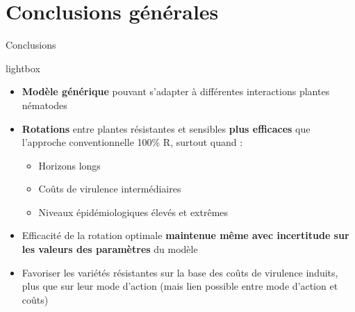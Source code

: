 \section{Conclusions générales}

\begin{frame}{Conclusions}
 \begin{beamercolorbox}[sep=1mm,rounded=true]{lightbox}
 \begin{itemize}[itemsep=3mm]
    
 \item \textbf{Modèle générique} pouvant s'adapter à différentes interactions plantes\\ nématodes
 \pause

 \item \textbf{Rotations} entre plantes résistantes et sensibles \textbf{plus efficaces} que \\ l'approche  conventionnelle 100\% R,  surtout quand :
    {\small \begin{itemize}
    \item Horizons longs 
    \item Coûts de virulence intermédiaires
    \item Niveaux épidémiologiques élevés et extrêmes
    \end{itemize}
   
}
 \pause
  \item Efficacité de la rotation  optimale  \textbf{maintenue même avec incertitude sur les valeurs  des paramètres} du modèle
 \pause 
  \item Favoriser les variétés résistantes sur la base des coûts de virulence induits, plus que sur leur mode d'action (mais lien possible entre mode d'action et coûts) 
 \end{itemize}
\end{beamercolorbox}

\end{frame}

